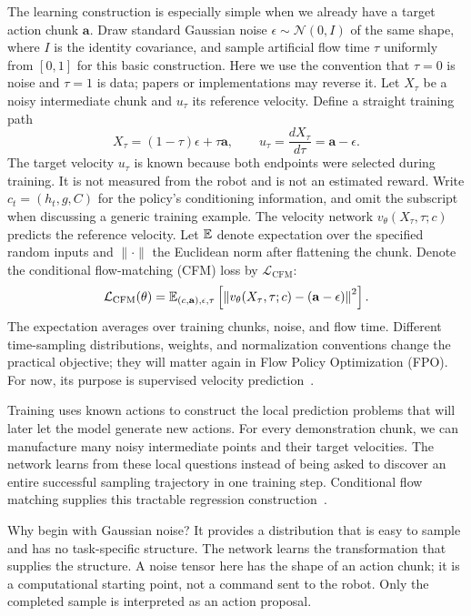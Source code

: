 The learning construction is especially simple when we already have a target action chunk $\mathbf a$. Draw standard Gaussian noise $\epsilon\sim\mathcal N(0,I)$ of the same shape, where $I$ is the identity covariance, and sample artificial flow time $\tau$ uniformly from $[0,1]$ for this basic construction. Here we use the convention that $\tau=0$ is noise and $\tau=1$ is data; papers or implementations may reverse it. Let $X_\tau$ be a noisy intermediate chunk and $u_\tau$ its reference velocity. Define a straight training path
\begin{equation}
 X_\tau=(1-\tau)\epsilon+\tau\mathbf a,
 \qquad u_\tau=\frac{dX_\tau}{d\tau}=\mathbf a-\epsilon.
 \label{eq:interpolation}
\end{equation}
The target velocity $u_\tau$ is known because both endpoints were selected during training. It is not measured from the robot and is not an estimated reward. Write $c_t=(h_t,g,C)$ for the policy's conditioning information, and omit the subscript when discussing a generic training example. The velocity network $v_\theta(X_\tau,\tau;c)$ predicts the reference velocity. Let $\mathbb{E}$ denote expectation over the specified random inputs and $\|\cdot\|$ the Euclidean norm after flattening the chunk. Denote the conditional flow-matching (CFM) loss by $\mathcal L_{\mathrm{CFM}}$:
\begin{equation}
 \mathcal L_{\mathrm{CFM}}(\theta)=
 \mathbb{E}_{(c,\mathbf a),\epsilon,\tau}
 \left[\left\|v_\theta(X_\tau,\tau;c)-(\mathbf a-\epsilon)\right\|^2\right].
 \label{eq:cfm}
\end{equation}
The expectation averages over training chunks, noise, and flow time. Different time-sampling distributions, weights, and normalization conventions change the practical objective; they will matter again in Flow Policy Optimization (FPO). For now, its purpose is supervised velocity prediction~\citep{flowguide}.

Training uses known actions to construct the local prediction problems that will later let the model generate new actions. For every demonstration chunk, we can manufacture many noisy intermediate points and their target velocities. The network learns from these local questions instead of being asked to discover an entire successful sampling trajectory in one training step. Conditional flow matching supplies this tractable regression construction~\citep{floworiginal}.

Why begin with Gaussian noise? It provides a distribution that is easy to sample and has no task-specific structure. The network learns the transformation that supplies the structure. A noise tensor here has the shape of an action chunk; it is a computational starting point, not a command sent to the robot. Only the completed sample is interpreted as an action proposal.

